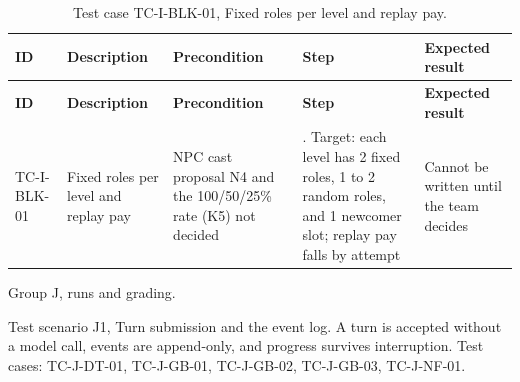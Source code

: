 {\small
\begin{longtable}{|>{\raggedright\arraybackslash}p{}|>{\raggedright\arraybackslash}p{}|>{\raggedright\arraybackslash}p{}|>{\raggedright\arraybackslash}p{}|>{\raggedright\arraybackslash}p{}|}
\caption{Test case TC-I-BLK-01, Fixed roles per level and replay pay.} \\
\hline
\textbf{ID} & \textbf{Description} & \textbf{Precondition} & \textbf{Step} & \textbf{Expected result} \\ \hline
\endfirsthead
\hline
\textbf{ID} & \textbf{Description} & \textbf{Precondition} & \textbf{Step} & \textbf{Expected result} \\ \hline
\endhead
TC-I-BLK-01 & Fixed roles per level and replay pay & NPC cast proposal N4 and the 100/50/25\% rate (K5) not decided & 1. Target: each level has 2 fixed roles, 1 to 2 random roles, and 1 newcomer slot; replay pay falls by attempt & Cannot be written until the team decides \\ \hline
\end{longtable}
}

Group J, runs and grading.

Test scenario J1, Turn submission and the event log. A turn is accepted without a model call, events are append-only, and progress survives interruption. Test cases: TC-J-DT-01, TC-J-GB-01, TC-J-GB-02, TC-J-GB-03, TC-J-NF-01.

